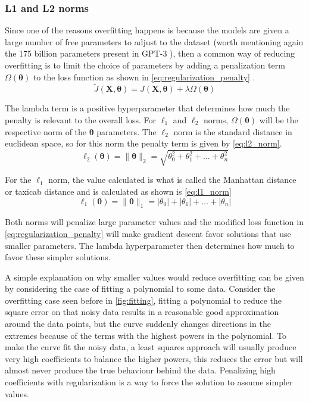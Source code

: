 \subsubsection{L1 and L2 norms}
Since one of the reasons overfitting happens is because the models are given a large number of free parameters to adjust to the dataset (worth mentioning again the 175 billion parameters present in GPT-3 \cite{gpt3_2020}), then a common way of reducing overfitting is to limit the choice of parameters by adding a penalization term $\Omega(\bm{\theta})$ to the loss function as shown in \autoref{eq:regularization_penalty} \cite[p. 226]{deepLearningBook2016}.
\begin{equation} \label{eq:regularization_penalty}
    \tilde{J}(\bm{X}, \bm{\theta}) = J(\bm{X}, \bm{\theta}) + \lambda\Omega(\bm{\theta})
\end{equation}

The \gls{lambda} term is a positive hyperparameter that determines how much the penalty is relevant to the overall loss. For $\ell_1$ and $\ell_2$ norms, $\Omega(\bm{\theta})$ will be the respective norm of the $\bm{\theta}$ parameters. The $\ell_2$ norm is the standard distance in euclidean space, so for this norm the penalty term is given by \autoref{eq:l2_norm}.
\begin{equation} \label{eq:l2_norm}
    \ell_2(\bm{\theta}) = \|\bm{\theta}\|_2 = \sqrt{\theta_0^2 + \theta_1^2 + \dots + \theta_n^2}
\end{equation}

For the $\ell_1$ norm, the value calculated is what is called the Manhattan distance or taxicab distance \cite[p. 102]{dataDrivenScience2019} and is calculated as shown is \autoref{eq:l1_norm}
\begin{equation} \label{eq:l1_norm}
    \ell_1(\bm{\theta}) = \|\bm{\theta}\|_1 =  |\theta_0| + |\theta_1| + \dots + |\theta_n|
\end{equation}

Both norms will penalize large parameter values and the modified loss function in \autoref{eq:regularization_penalty} will make gradient descent favor solutions that use smaller parameters. The \gls{lambda} hyperparameter then determines how much to favor these simpler solutions.

A simple explanation on why smaller values would reduce overfitting can be given by considering the case of fitting a polynomial to some data. Consider the overfitting case seen before in \autoref{fig:fitting}, fitting a polynomial to reduce the square error on that noisy data results in a reasonable good approximation around the data points, but the curve suddenly changes directions in the extremes because of the terms with the highest powers in the polynomial. To make the curve fit the noisy data, a least squares approach will usually produce very high coefficients to balance the higher powers, this reduces the error but will almost never produce the true behaviour behind the data. Penalizing high coefficients with regularization is a way to force the solution to assume simpler values.

